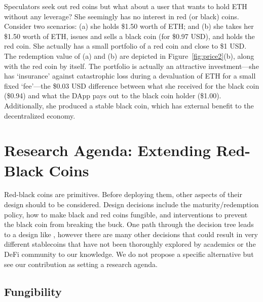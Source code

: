 Speculators seek out red coins but what about a user that wants to hold ETH without any leverage? She seemingly has no interest in red (or black) coins. Consider two scenarios: (a) she holds \$1.50 worth of ETH; and (b) she takes her \$1.50 worth of ETH, issues and sells a black coin (\eg for \$0.97 USD), and holds the red coin. She actually has a small portfolio of a red coin and close to \$1 USD. The redemption value of (a) and (b) are depicted in Figure~\ref{fig:price2}(b), along with the red coin by itself. The portfolio is actually an attractive investment---she has `insurance' against catastrophic loss during a devaluation of ETH for a small fixed `fee'---the \$0.03 USD difference between what she received for the black coin (\$0.94) and what the DApp pays out to the black coin holder (\$1.00). Additionally, she produced a stable black coin, which has external benefit to the decentralized economy. 



\section{Research Agenda: Extending Red-Black Coins}
\label{sec:taxonomy}

Red-black coins are primitives. Before deploying them, other aspects of their design should to be considered. Design decisions include the maturity/redemption policy, how to make black and red coins fungible, and interventions to prevent the black coin from breaking the buck. One path through the decision tree leads to a design like \dai, however there are many other decisions that could result in very different stablecoins that have not been thoroughly explored by academics or the DeFi community to our knowledge. We do not propose a specific alternative but see our contribution as setting a research agenda. 



\subsection{Fungibility}


